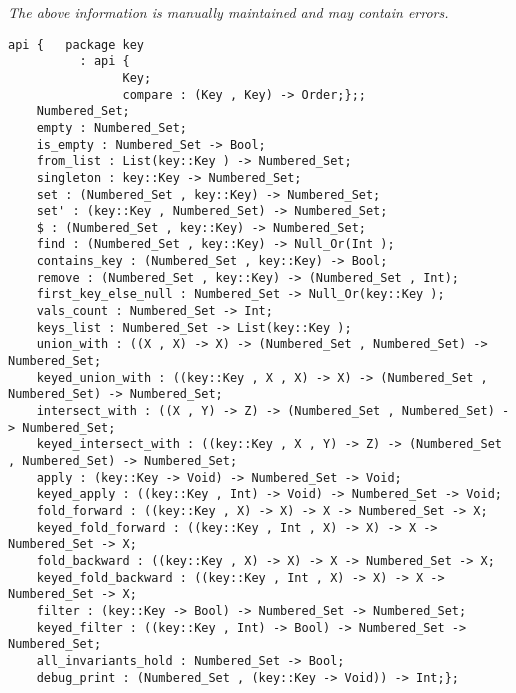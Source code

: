 \label{api:Numbered\_Set}

{\tiny \it The above information is manually maintained and may contain errors.}
\begin{verbatim}
api {   package key
          : api {
                Key;
                compare : (Key , Key) -> Order;};;
    Numbered_Set;
    empty : Numbered_Set;
    is_empty : Numbered_Set -> Bool;
    from_list : List(key::Key ) -> Numbered_Set;
    singleton : key::Key -> Numbered_Set;
    set : (Numbered_Set , key::Key) -> Numbered_Set;
    set' : (key::Key , Numbered_Set) -> Numbered_Set;
    $ : (Numbered_Set , key::Key) -> Numbered_Set;
    find : (Numbered_Set , key::Key) -> Null_Or(Int );
    contains_key : (Numbered_Set , key::Key) -> Bool;
    remove : (Numbered_Set , key::Key) -> (Numbered_Set , Int);
    first_key_else_null : Numbered_Set -> Null_Or(key::Key );
    vals_count : Numbered_Set -> Int;
    keys_list : Numbered_Set -> List(key::Key );
    union_with : ((X , X) -> X) -> (Numbered_Set , Numbered_Set) -> Numbered_Set;
    keyed_union_with : ((key::Key , X , X) -> X) -> (Numbered_Set , Numbered_Set) -> Numbered_Set;
    intersect_with : ((X , Y) -> Z) -> (Numbered_Set , Numbered_Set) -> Numbered_Set;
    keyed_intersect_with : ((key::Key , X , Y) -> Z) -> (Numbered_Set , Numbered_Set) -> Numbered_Set;
    apply : (key::Key -> Void) -> Numbered_Set -> Void;
    keyed_apply : ((key::Key , Int) -> Void) -> Numbered_Set -> Void;
    fold_forward : ((key::Key , X) -> X) -> X -> Numbered_Set -> X;
    keyed_fold_forward : ((key::Key , Int , X) -> X) -> X -> Numbered_Set -> X;
    fold_backward : ((key::Key , X) -> X) -> X -> Numbered_Set -> X;
    keyed_fold_backward : ((key::Key , Int , X) -> X) -> X -> Numbered_Set -> X;
    filter : (key::Key -> Bool) -> Numbered_Set -> Numbered_Set;
    keyed_filter : ((key::Key , Int) -> Bool) -> Numbered_Set -> Numbered_Set;
    all_invariants_hold : Numbered_Set -> Bool;
    debug_print : (Numbered_Set , (key::Key -> Void)) -> Int;};
\end{verbatim}
\index[fun]{\$}
